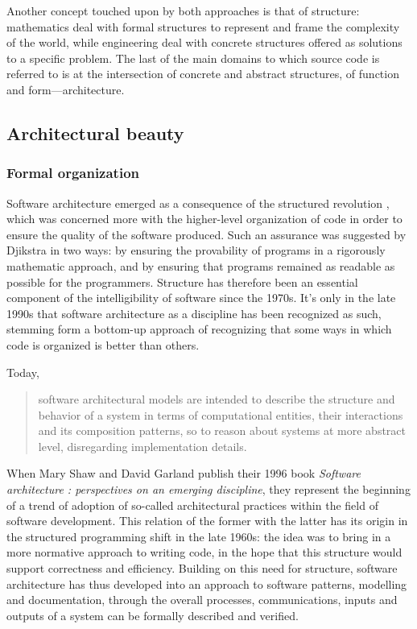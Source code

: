 Another concept touched upon by both approaches is that of structure: mathematics deal with formal structures to represent and frame the complexity of the world, while engineering deal with concrete structures offered as solutions to a specific problem. The last of the main domains to which source code is referred to is at the intersection of concrete and abstract structures, of function and form—architecture.

\subsection{Architectural beauty}
\label{subsec:beauty-architecture}

\subsubsection{Formal organization}
\label{subsubsec:formal-organization}

Software architecture emerged as a consequence of the structured revolution \citep{dijkstra_chapter_1972}, which was concerned more with the higher-level organization of code in order to ensure the quality of the software produced. Such an assurance was suggested by Djikstra in two ways: by ensuring the provability of programs in a rigorously mathematic approach, and by ensuring that programs remained as readable as possible for the programmers. Structure has therefore been an essential component of the intelligibility of software since the 1970s. It's only in the late 1990s that software architecture as a discipline has been recognized as such, stemming form a bottom-up approach of recognizing that some ways in which code is organized is better than others.

Today,
\begin{quote}
  software architectural models are intended to describe the structure and behavior of a system in terms of computational entities, their interactions and its composition patterns, so to reason about systems at more abstract  level, disregarding implementation details. \citep{garland_software_2000}
\end{quote}

When Mary Shaw and David Garland publish their 1996 book \emph{Software architecture : perspectives on an emerging discipline}, they represent the beginning of a trend of adoption of so-called architectural practices within the field of software development. This relation of the former with the latter has its origin in the structured programming shift in the late 1960s: the idea was to bring in a more normative approach to writing code, in the hope that this structure would support correctness and efficiency. Building on this need for structure, software architecture has thus developed into an approach to software patterns, modelling and documentation, through the overall processes, communications, inputs and outputs of a system can be formally described and verified.

